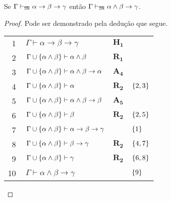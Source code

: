 \vspace{.5\baselineskip}
\begin{tcolorbox}[enhanced jigsaw, breakable, sharp corners, colframe=black, colback=white, boxrule=0.5pt, left=1.5mm, right=1.5mm, top=1.5mm, bottom=1.5mm]
    \begin{lemma}[Importação]\label{importation}
        Se $\Gamma\mathrel{\vdash}_\mathfrak{M}\alpha\to\beta\to\gamma$ então $\Gamma\mathrel{\vdash}_\mathfrak{M}\alpha\wedge\beta\to\gamma$.
        \begin{proof}
        Pode ser demonstrado pela dedução que segue.

        \vspace{0.5\baselineskip}
        \footnotesize
        \setlength{\rowskip}{0.5\baselineskip}
        \begin{xltabular}{\textwidth}{r | X l l}
            \scriptsize{\phantom{0}1}\phantom{ } & $\ \Gamma\vdash\alpha\to\beta\to\gamma$                               & $\mathbf{H_1}$\phantom{1}                & \\[\rowskip]
            \scriptsize{\phantom{0}2}\phantom{ } & $\ \Gamma\cup\set{\alpha\wedge\beta}\vdash\alpha\wedge\beta$          & $\hyperref[modal.rule.1]{\mathbf{R_1}}$  & \\[\rowskip]
            \scriptsize{\phantom{0}3}\phantom{ } & $\ \Gamma\cup\set{\alpha\wedge\beta}\vdash\alpha\wedge\beta\to\alpha$ & $\hyperref[modal.axiom.4]{\mathbf{A_4}}$ & \\[\rowskip]
            \scriptsize{\phantom{0}4}\phantom{ } & $\ \Gamma\cup\set{\alpha\wedge\beta}\vdash\alpha$                     & $\hyperref[modal.rule.2]{\mathbf{R_2}}$  & $\left\{2,3\right\}$\\[\rowskip]
            \scriptsize{\phantom{0}5}\phantom{ } & $\ \Gamma\cup\set{\alpha\wedge\beta}\vdash\alpha\wedge\beta\to\beta$  & $\hyperref[modal.axiom.5]{\mathbf{A_5}}$ & \\[\rowskip]
            \scriptsize{\phantom{0}6}\phantom{ } & $\ \Gamma\cup\set{\alpha\wedge\beta}\vdash\beta$                      & $\hyperref[modal.rule.2]{\mathbf{R_2}}$  & $\left\{2,5\right\}$\\[\rowskip]
            \scriptsize{\phantom{0}7}\phantom{ } & $\ \Gamma\cup\set{\alpha\wedge\beta}\vdash\alpha\to\beta\to\gamma$    &                      & $\left\{1\right\}$\\[\rowskip]
            \scriptsize{\phantom{0}8}\phantom{ } & $\ \Gamma\cup\set{\alpha\wedge\beta}\vdash\beta\to\gamma$             & $\hyperref[modal.rule.2]{\mathbf{R_2}}$  & $\left\{4,7\right\}$\\[\rowskip]
            \scriptsize{\phantom{0}9}\phantom{ } & $\ \Gamma\cup\set{\alpha\wedge\beta}\vdash\gamma$                     & $\hyperref[modal.rule.2]{\mathbf{R_2}}$  & $\left\{6,8\right\}$\\[\rowskip]
            \scriptsize{10}\phantom{ }           & $\ \Gamma\vdash\alpha\wedge\beta\to\gamma$                            &                      & $\left\{9\right\}$
        \end{xltabular}
        \normalsize


\end{proof}
\end{lemma}
\end{tcolorbox}
